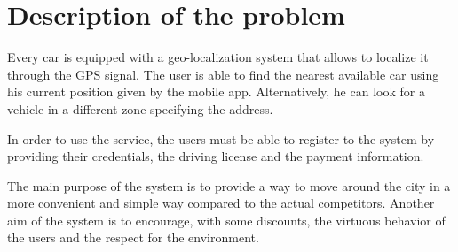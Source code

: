 \section{Description of the problem}

Every car is equipped with a geo-localization system that allows to localize it through the GPS signal.
The user is able to find the nearest available car using his current position given by the mobile app.
Alternatively, he can look for a vehicle in a different zone specifying the address.

In order to use the service, the users must be able to register to the system by providing their credentials, the driving license and the payment information.


The main purpose of the system is to provide a way to move around the city in a more convenient and simple way compared to the actual competitors. Another aim of the system is to encourage, with some discounts, the virtuous behavior of the users and the respect for the environment.